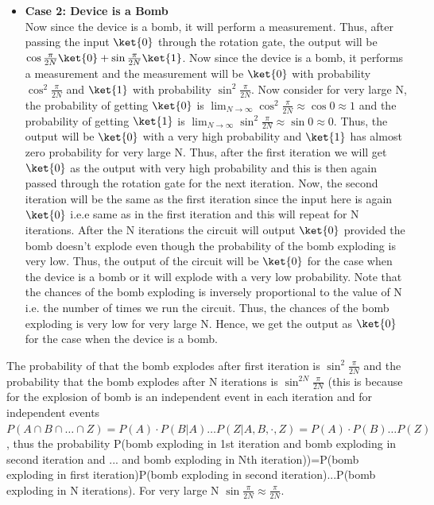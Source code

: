 \documentclass[12pt, oneside]{book}
\theoremstyle{definition}
\theoremstyle{definition}
\theoremstyle{remark}
\begin{document}
\begin{itemize}
        \item \textbf{Case 2: Device is a Bomb}\\
        Now since the device is a bomb, it will perform a measurement. Thus, after passing the input $\ket{0}$ through the rotation gate, the output will be $\cos\frac{\pi}{2N}\ket{0}+\sin\frac{\pi}{2N}\ket{1}$.
        Now since the device is a bomb, it performs a measurement and the measurement will be $\ket{0}$ with probability $\cos^2\frac{\pi}{2N}$ and $\ket{1}$ with probability $\sin^2\frac{\pi}{2N}$. Now consider for very large N,
        the probability of getting $\ket{0}$ is $\lim_{N\rightarrow \infty} \cos^2\frac{\pi}{2N}\approx \cos 0 \approx 1$ and the probability of getting $\ket{1}$ is $\lim_{N\rightarrow \infty} \sin^2\frac{\pi}{2N}\approx \sin 0 \approx 0$. Thus, the output will be $\ket{0}$ with a very high probability and $\ket{1}$ has almost zero probability for very large N.
        Thus, after the first iteration we will get $\ket{0}$ as the output with very high probability and this is then again passed through the rotation gate for the next iteration. Now, the second iteration will be the same as the first iteration since the input here is again $\ket{0}$ i.e.e same as in the first iteration and this will repeat for N iterations. 
        After the N iterations the circuit will output $\ket{0}$ provided the bomb doesn't explode even though the probability of the bomb exploding is very low. Thus, the output of the circuit will be $\ket{0}$ for the case when the device is a bomb or it will explode with a very low probability. Note that the chances of the bomb exploding is inversely proportional to the 
        value of N i.e. the number of times we run the circuit. Thus, the chances of the bomb exploding is very low for very large N. Hence, we get the output as $\ket{0}$ for the case when the device is a bomb.
    \end{itemize}
    The probability of that the bomb explodes after first iteration is $\sin^2 \frac{\pi}{2N}$ and the probability that the bomb explodes after N iterations is $\sin^{2N} \frac{\pi}{2N}$ (this is because for the explosion of bomb is an independent event in each iteration and for independent events $P(A\cap B \cap \ldots \cap Z)=P(A)\cdot P(B|A)\ldots P(Z|A,B,\cdot,Z)=P(A)\cdot P(B)\ldots P(Z)$, 
    thus the probability P(bomb exploding in 1st iteration and bomb exploding in second iteration and ... and bomb exploding in Nth iteration))=P(bomb exploding in first iteration)P(bomb exploding in second iteration)...P(bomb exploding in N iterations). For very large N $\sin \frac{\pi}{2N} \approx \frac{\pi}{2N}$.
\end{document}
